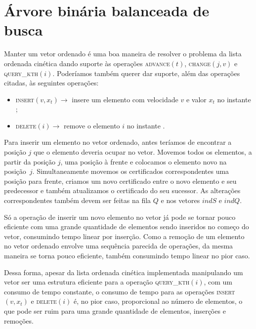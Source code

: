 

\section{Árvore binária balanceada de busca} \label{sec:abb}

Manter um vetor ordenado é uma boa maneira de resolver o problema da
lista ordenada cinética dando suporte às operações
\textsc{advance}$(t)$, \textsc{change}$(j,v)$ e
\textsc{query\_kth}$(i)$.
Poderíamos também querer dar suporte, além das operações citadas, às seguintes operações:

\begin{itemize}
    \item \textsc{insert}$(v, x_t) \rightarrow$ insere um
    elemento com velocidade $v$ e valor $x_t$ no instante \now;
    \item \textsc{delete}$(i) \rightarrow$ remove o elemento
    $i$ no instante \now.
\end{itemize}

Para inserir um elemento no vetor ordenado, antes teríamos de
encontrar a posição $j$ que o elemento deveria ocupar no vetor.
Movemos todos os elementos, a partir da posição $j$, uma posição à
frente e colocamos o elemento novo na posição~$j$.
Simultaneamente movemos os certificados correspondentes uma posição para frente, criamos um novo
certificado entre o novo elemento e seu predecessor e também atualizamos o certificado do seu
sucessor.
As alterações correspondentes também devem ser feitas na fila $Q$ e nos vetores $\textit{indS}$ e
$\textit{indQ}$.

Só a operação de inserir um novo elemento no vetor já pode se tornar
pouco eficiente com uma grande quantidade de elementos sendo
inseridos no começo do vetor, consumindo tempo linear por inserção.
Como a remoção de um elemento no vetor ordenado envolve uma
sequência parecida de operações, da mesma maneira se torna pouco
eficiente, também consumindo tempo linear no pior caso.

Dessa forma, apesar da lista ordenada cinética implementada
manipulando um vetor ser uma estrutura eficiente para a operação
\textsc{query\_kth}$(i)$, com um consumo de tempo constante, o
consumo de tempo para as operações \textsc{insert}$(v, x_t)$ e
\textsc{delete}$(i)$ é, no pior caso, proporcional ao número de
elementos, o que pode ser ruim para uma grande quantidade de
elementos, inserções e remoções.

